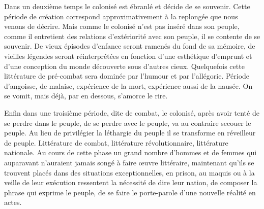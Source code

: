 \documentclass[french,twoside]{book} %
\begin{document}
Dans un deuxième temps le colonisé est ébranlé et décide de se souvenir. Cette période de création correspond approximativement à la replongée que nous venons de décrire. Mais comme le colonisé n’est pas inséré dans son peuple, comme il entretient des relations d’extériorité avec son peuple, il se contente de se souvenir. De vieux épisodes d’enfance seront ramenés du fond de sa mémoire, de vieilles légendes seront réinterprétées en fonction d’une esthétique d’emprunt et d’une conception du monde découverte sous d’autres cieux. Quelquefois cette littérature de pré-combat sera dominée par l’humour et par l’allégorie. Période d’angoisse, de malaise, expérience de la mort, expérience aussi de la nausée. On se vomit, mais déjà, par en dessous, s’amorce le rire.\par
Enfin dans une troisième période, dite de combat, le colonisé, après avoir tenté de se perdre dans le peuple, de se perdre avec le peuple, va au contraire secouer le peuple. Au lieu de privilégier la léthargie du peuple il se transforme en réveilleur de peuple. Littérature de combat, littérature révolutionnaire, littérature nationale. Au cours de cette phase un grand nombre d’hommes et de femmes qui auparavant n’auraient jamais songé   à faire œuvre littéraire, maintenant qu’ils se trouvent placés dans des situations exceptionnelles, en prison, au maquis ou à la veille de leur exécution ressentent la nécessité de dire leur nation, de composer la phrase qui exprime le peuple, de se faire le porte-parole d’une nouvelle réalité en actes.\par
\bigbreak
\end{document}
